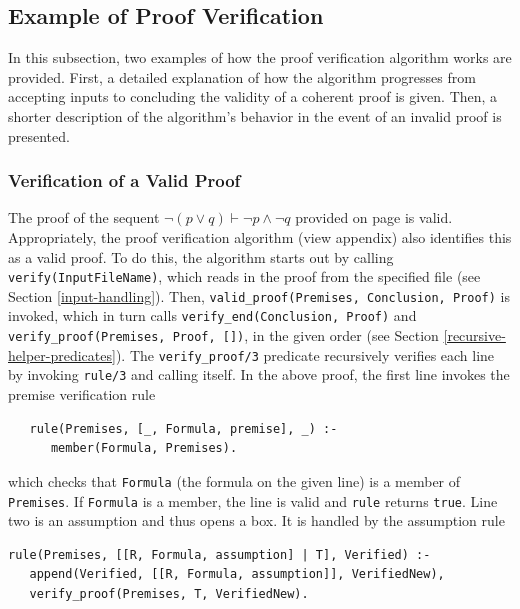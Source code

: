 \documentclass[a4paper, 11pt]{article}
\begin{document}
   \subsection{Example of Proof Verification}

   In this subsection, two examples of how the proof
   verification algorithm works are provided. First, a
   detailed explanation of how the algorithm progresses from
   accepting inputs to concluding the validity of a coherent
   proof is given. Then, a shorter description of the 
   algorithm's behavior in the event of an invalid proof is 
   presented.
   
   \subsubsection{Verification of a Valid Proof}

   The proof of the sequent 
   $\neg(p \lor q) \vdash \neg p \land \neg q$ provided on
   page \pageref{de-morgan-proof} is valid. Appropriately, 
   the proof verification algorithm (view appendix) also
   identifies this as a valid proof. To do this, the 
   algorithm starts out by calling \\
   \texttt{verify(InputFileName)}, which reads in the proof 
   from the specified file (see Section \ref{input-handling}).
   Then, \texttt{valid\_proof(Premises, Conclusion, Proof)} 
   is invoked, which in turn calls
   \texttt{verify\_end(Conclusion, Proof)} and \\
   \texttt{verify\_proof(Premises, Proof, [])}, in the given 
   order (see Section \ref{recursive-helper-predicates}).
   The \texttt{verify\_proof/3} predicate recursively
   verifies each line by invoking \texttt{rule/3} and
   calling itself. In the above proof, the first
   line invokes the premise verification rule

\begin{verbatim}
   rule(Premises, [_, Formula, premise], _) :-
      member(Formula, Premises).
\end{verbatim}
                    
   which checks that \texttt{Formula} (the formula
   on the given line) is a member of
   \texttt{Premises}. If \texttt{Formula} is a
   member, the line is valid and \texttt{rule} returns
   \texttt{true}. Line two is an assumption and thus 
   opens a box. It is handled by the assumption rule

\begin{verbatim}
rule(Premises, [[R, Formula, assumption] | T], Verified) :-
   append(Verified, [[R, Formula, assumption]], VerifiedNew),
   verify_proof(Premises, T, VerifiedNew).
\end{verbatim}
\end{document}
